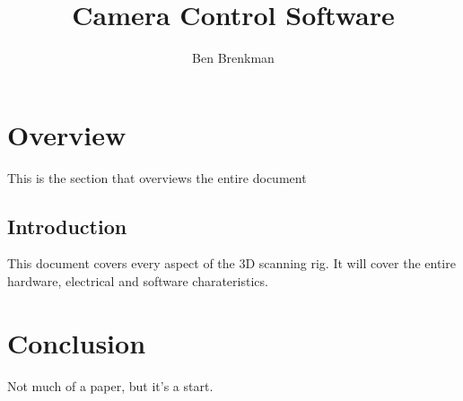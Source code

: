 \documentclass[titlepage]{hitec}
\title{Camera Control Software}
\author{Ben Brenkman}
\begin{document}
\maketitle

\tableofcontents

\section*{Overview}
This is the section that overviews the entire document
\subsection*{Introduction}
This document covers every aspect of the 3D scanning rig. It will cover the entire hardware, electrical and software charateristics.





\section{Conclusion}
Not much of a paper, but it's a start.
\end{document}
